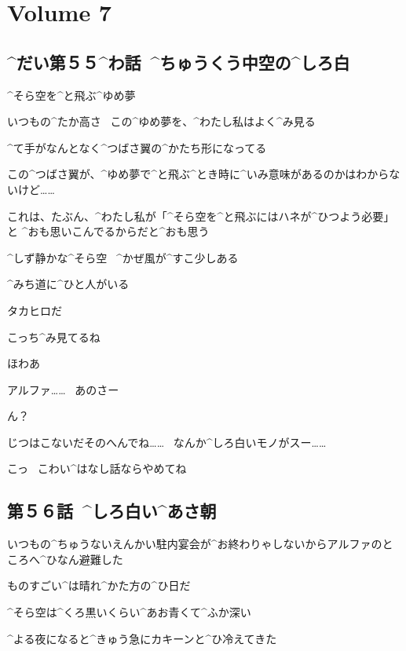 \section{Volume 7}

\subsection{^{だい}{第}５５^{わ}{話}\ ^{ちゅうくう}{中空}の^{しろ}{白}}

\page[2]
\Alpha ^{そら}{空}を^{と}{飛}ぶ^{ゆめ}{夢}

\Alpha いつもの^{たか}{高}さ
\ この^{ゆめ}{夢}を、^{わたし}{私}はよく^{み}{見}る

\page
\Alpha ^{て}{手}がなんとなく^{つばさ}{翼}の^{かたち}{形}になってる

\Alpha この^{つばさ}{翼}が、^{ゆめ}{夢}で^{と}{飛}ぶ^{とき}{時}に^{いみ}{意味}があるのかはわからないけど……

\Alpha これは、たぶん、^{わたし}{私}が「^{そら}{空}を^{と}{飛}ぶにはハネが^{ひつよう}{必要}」と
^{おも}{思}いこんでるからだと^{おも}{思}う

\page
\Alpha ^{しず}{静}かな^{そら}{空}
\ ^{かぜ}{風}が^{すこ}{少}しある

\page
\Alpha ^{みち}{道}に^{ひと}{人}がいる

\page
\Alpha タカヒロだ

\Alpha こっち^{み}{見}てるね

\page
\Alpha ほわあ

\page
\Takahiro アルファ……
\ あのさー

\Alpha ん？

\Takahiro じつはこないだそのへんでね……
\ なんか^{しろ}{白}いモノがスー……

\Alpha こっ
\ こわい^{はなし}{話}ならやめてね


\subsection{第５６話\ ^{しろ}{白}い^{あさ}{朝}}

\page[10]
\Takahiro いつもの^{ちゅうないえんかい}{駐内宴会}が^{お}{終}わりゃしないからアルファのところへ^{ひなん}{避難}した

\Takahiro ものすごい^{は}{晴}れ^{かた}{方}の^{ひ}{日}だ

\Takahiro ^{そら}{空}は^{くろ}{黒}いくらい^{あお}{青}くて^{ふか}{深}い

\page[12]
\Takahiro ^{よる}{夜}になると^{きゅう}{急}にカキーンと^{ひ}{冷}えてきた

